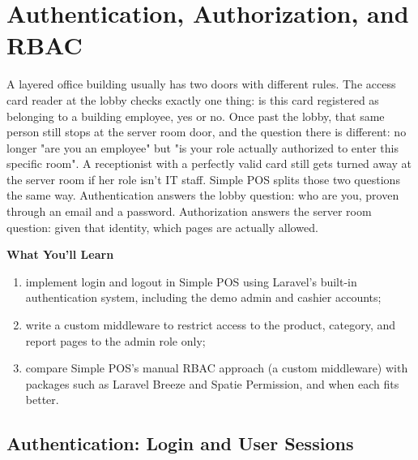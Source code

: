 
\chapter{Authentication, Authorization, and RBAC}
\label{ch:autentikasi-dan-otorisasi}


A layered office building usually has two doors with different rules.
The access card reader at the lobby checks exactly one thing: is this
card registered as belonging to a building employee, yes or no. Once
past the lobby, that same person still stops at the server room door,
and the question there is different: no longer "are you an employee"
but "is your role actually authorized to enter this specific room". A
receptionist with a perfectly valid card still gets turned away at the
server room if her role isn't IT staff. Simple POS splits those two
questions the same way. Authentication answers the lobby question: who
are you, proven through an email and a password. Authorization answers
the server room question: given that identity, which pages are actually
allowed.

\textbf{What You'll Learn}

\begin{enumerate}
  \item implement login and logout in Simple POS using Laravel's built-in authentication system, including the demo admin and cashier accounts;
  \item write a custom  middleware to restrict access to the product, category, and report pages to the admin role only;
  \item compare Simple POS's manual RBAC approach (a custom middleware) with packages such as Laravel Breeze and Spatie Permission, and when each fits better.
\end{enumerate}

\section{Authentication: Login and User Sessions}
\label{sec:autentikasi-dan-otorisasi-1}

